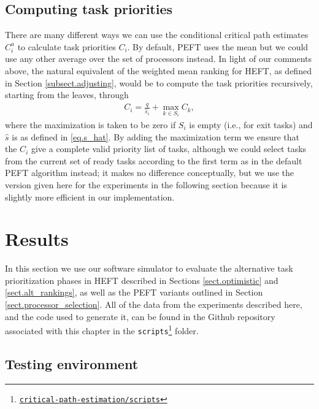 \documentclass[12pt]{article}
\begin{document}
\subsection{Computing task priorities}
\label{subsect.ps_priorities}

There are many different ways we can use the conditional critical path estimates $C_i^a$ to calculate task priorities $C_i$. By default, PEFT uses the mean but we could use any other average over the set of processors instead. In light of our comments above, the natural equivalent of the weighted mean ranking for HEFT, as defined in Section \ref{subsect.adjusting}, would be to compute the task priorities recursively, starting from the leaves, through 
\begin{align}
C_i = \frac{q}{\hat{s}_i} + \max_{k \in S_i} C_k, \label{eq.alt_prios}
\end{align}  
where the maximization is taken to be zero if $S_i$ is empty (i.e., for exit tasks) and $\hat{s}$ is as defined in \eqref{eq.s_hat}. By adding the maximization term we ensure that the $C_i$ give a complete valid priority list of tasks, although we could select tasks from the current set of ready tasks according to the first term as in the default PEFT algorithm instead; it makes no difference conceptually, but we use the version given here for the experiments in the following section because it is slightly more efficient in our implementation.

\section{Results}
\label{sect.results}

In this section we use our software simulator to evaluate the alternative task prioritization phases in HEFT described in Sections \ref{sect.optimistic} and \ref{sect.alt_rankings}, as well as the PEFT variants outlined in Section \ref{sect.processor_selection}. All of the data from the experiments described here, and the code used to generate it, can be found in the Github repository associated with this chapter in the {\tt scripts}\footnote{\href{https://github.com/mcsweeney90/critical-path-estimation}{{\tt \small critical-path-estimation/scripts}}} folder. 

\subsection{Testing environment}
\label{subsect.graphs}
\end{document}

